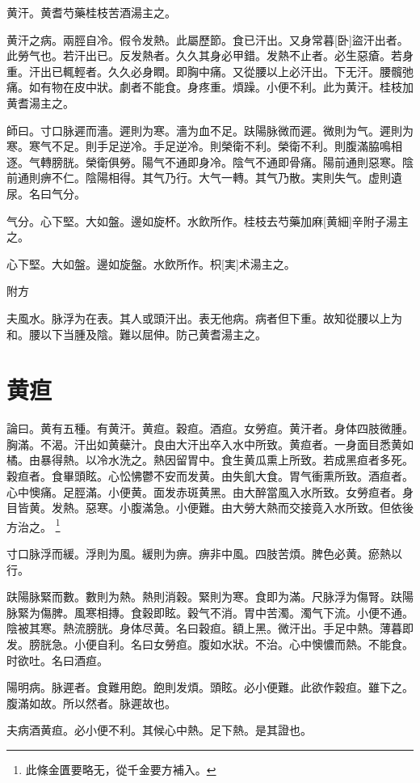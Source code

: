 \documentclass[12pt,oneside,UTF8,b5paper]{ctexbook}她她她她她她她
\begin{document}
黄汗。黄耆芍藥桂枝苦酒湯主之。

黄汗之病。兩脛自冷。假令发熱。此屬歷節。食已汗出。又身常暮[卧]盜汗出者。此勞气也。若汗出已。反发熱者。久久其身必甲錯。发熱不止者。必生惡瘡。若身重。汗出已輒輕者。久久必身瞤。即胸中痛。又從腰以上必汗出。下无汗。腰髖弛痛。如有物在皮中狀。劇者不能食。身疼重。煩躁。小便不利。此为黄汗。桂枝加黄耆湯主之。

師曰。寸口脉遲而濇。遲則为寒。濇为血不足。趺陽脉微而遲。微則为气。遲則为寒。寒气不足。則手足逆冷。手足逆冷。則榮衛不利。榮衛不利。則腹滿脇鳴相逐。气轉膀胱。榮衛俱勞。陽气不通即身冷。陰气不通即骨痛。陽前通則惡寒。陰前通則痹不仁。陰陽相得。其气乃行。大气一轉。其气乃散。実則失气。虚則遺尿。名曰气分。

气分。心下堅。大如盤。邊如旋杯。水飲所作。桂枝去芍藥加麻[黄細]辛附子湯主之。

心下堅。大如盤。邊如旋盤。水飲所作。枳[実]术湯主之。

附方

夫風水。脉浮为在表。其人或頭汗出。表无他病。病者但下重。故知從腰以上为和。腰以下当腫及陰。難以屈伸。防己黄耆湯主之。

\chapter{黄疸}

論曰。黄有五種。有黄汗。黄疸。穀疸。酒疸。女勞疸。黄汗者。身体四肢微腫。胸滿。不渴。汗出如黄蘗汁。良由大汗出卒入水中所致。黄疸者。一身面目悉黄如橘。由暴得熱。以冷水洗之。熱因留胃中。食生黄瓜熏上所致。若成黑疸者多死。穀疸者。食畢頭眩。心忪怫鬱不安而发黄。由失飢大食。胃气衝熏所致。酒疸者。心中懊痛。足脛滿。小便黄。面发赤斑黄黑。由大醉當風入水所致。女勞疸者。身目皆黄。发熱。惡寒。小腹滿急。小便難。由大勞大熱而交接竟入水所致。但依後方治之。
	\footnote{此條金匱要略无，從千金要方補入。}

寸口脉浮而緩。浮則为風。緩則为痹。痹非中風。四肢苦煩。脾色必黄。瘀熱以行。

趺陽脉緊而數。數則为熱。熱則消穀。緊則为寒。食即为滿。尺脉浮为傷腎。趺陽脉緊为傷脾。風寒相摶。食穀即眩。穀气不消。胃中苦濁。濁气下流。小便不通。陰被其寒。熱流膀胱。身体尽黄。名曰穀疸。額上黑。微汗出。手足中熱。薄暮即发。膀胱急。小便自利。名曰女勞疸。腹如水狀。不治。心中懊憹而熱。不能食。时欲吐。名曰酒疸。

陽明病。脉遲者。食難用飽。飽則发煩。頭眩。必小便難。此欲作穀疸。雖下之。腹滿如故。所以然者。脉遲故也。

夫病酒黄疸。必小便不利。其候心中熱。足下熱。是其證也。
\end{document}
